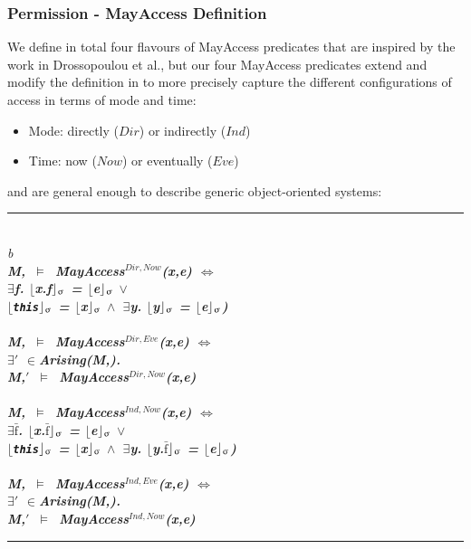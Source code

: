 \documentclass[a4paper,11pt,twoside]{article}
\makeatletter
\newenvironment{logic}
{\begin{minipage}[c]{\linewidth}  \sffamily \mdseries \begin{tabbing}}
{\end{tabbing}\end{minipage}\vspace{0.3em}}
\newcommand{\loin}{$\in$}
\newcommand{\loexists}{$\exists$}
\newcommand{\loand}{$\land$}
\newcommand{\loor} {$\lor$}
\newcommand{\losigma}{\text{$\upsigma$}}
\newcommand{\loturns} {$\vDash$}
\newcommand{\loiff} {$\iff$}
\newcommand{\loexec}[2] {$\lfloor$#1$\rfloor _{\text{#2}}$}
\newcommand{\loconj}[1] {$\bar{\text{#1}}$}
\newcommand{\hr}{\rule{\linewidth}{0.4pt}}
\DeclareRobustCommand{\emp}{%
  \@nomath\em \if b\expandafter\@car\f@series\@nil
  \normalfont \else \sffamily \bfseries \fi}
\makeatother
\begin{document}
\subsubsection{Permission - MayAccess Definition}\label{MayAccess}
We define in total four flavours of MayAccess predicates that are inspired by the work in Drossopoulou et al.\cite{drossopoulou2015b}, but our four MayAccess predicates extend and modify the definition in \cite{drossopoulou2015b} to more precisely capture the different configurations of access in terms of mode and time: 
\begin{itemize}
\item Mode: directly ($Dir$) or indirectly ($Ind$)
\item Time: now ($Now$) or eventually ($Eve$)
\end{itemize}
and are general enough to describe generic object-oriented systems:

\begin{logic}
\hr\\
\emp{Definition---[MayAccess]}\\

M,\losigma\ \loturns\ \=MayAccess$^{Dir,Now}$(x,e) \loiff \\
\>\loexists f. \loexec{x.f}{\losigma} = \loexec{e}{\losigma}
\loor \\
\> \loexec{\texttt{this}}{\losigma} = \loexec{x}{\losigma} \loand\ \loexists y. \loexec{y}{\losigma} = \loexec{e}{\losigma})\\
\\
 M,\losigma\ \loturns\ \=MayAccess$^{Dir,Eve}$(x,e) \loiff \\
\>\loexists \losigma$'$ \loin Arising(M,\losigma).\\
\>M,\losigma$'$\ \loturns\ MayAccess$^{Dir,Now}$(x,e)\\
\\
M,\losigma\ \loturns\ \=MayAccess$^{Ind,Now}$(x,e) \loiff \\
\>\loexists \loconj{f}. \loexec{x.\loconj{f}}{\losigma} = \loexec{e}{\losigma}
\loor \\
\> \loexec{\texttt{this}}{\losigma} = \loexec{x}{\losigma} \loand\ \loexists y. \loexec{y.\loconj{f}}{\losigma} = \loexec{e}{\losigma})\\
\\
M,\losigma\ \loturns\ \=MayAccess$^{Ind,Eve}$(x,e) \loiff \\
\>\loexists \losigma$'$ \loin Arising(M,\losigma).\\
\>M,\losigma$'$\ \loturns\ MayAccess$^{Ind,Now}$(x,e)\\
\hr
\end{logic}
\end{document}
